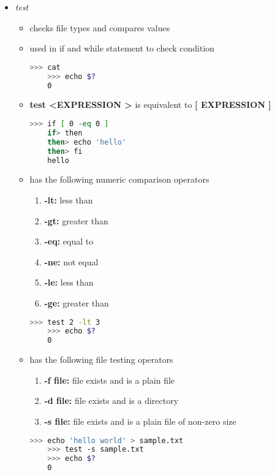 \documentclass[12pt]{article}
\begin{document}
\begin{itemize}
    \item \textit{test}
    \begin{itemize}
    \item checks file types and compares values
    \item used in if and while statement to check condition

    \begin{lstlisting}[language=bash]
    >>> cat
    >>> echo $?
    0
    \end{lstlisting}

    \item \textbf{test \textless EXPRESSION \textgreater} is equivalent to
    \textbf{[ EXPRESSION ]}

    \begin{lstlisting}[language=bash]
    >>> if [ 0 -eq 0 ]
    if> then
    then> echo 'hello'
    then> fi
    hello
    \end{lstlisting}

    \item has the following numeric comparison operators
    \begin{enumerate}[1.]
    \item \textbf{-lt:} less than
    \item \textbf{-gt:} greater than
    \item \textbf{-eq:} equal to
    \item \textbf{-ne:} not equal
    \item \textbf{-le:} less than
    \item \textbf{-ge:} greater than
    \end{enumerate}

    \begin{lstlisting}[language=bash]
    >>> test 2 -lt 3
    >>> echo $?
    0
    \end{lstlisting}

    \item has the following file testing operators
    \begin{enumerate}[1.]
    \item \textbf{-f file:} file exists and is a plain file
    \item \textbf{-d file:} file exists and is a directory
    \item \textbf{-s file:} file exists and is a plain file of non-zero size
    \end{enumerate}

    \begin{lstlisting}[language=bash]
    >>> echo 'hello world' > sample.txt
    >>> test -s sample.txt
    >>> echo $?
    0
    \end{lstlisting}


\end{itemize}
\end{itemize}
\end{document}

